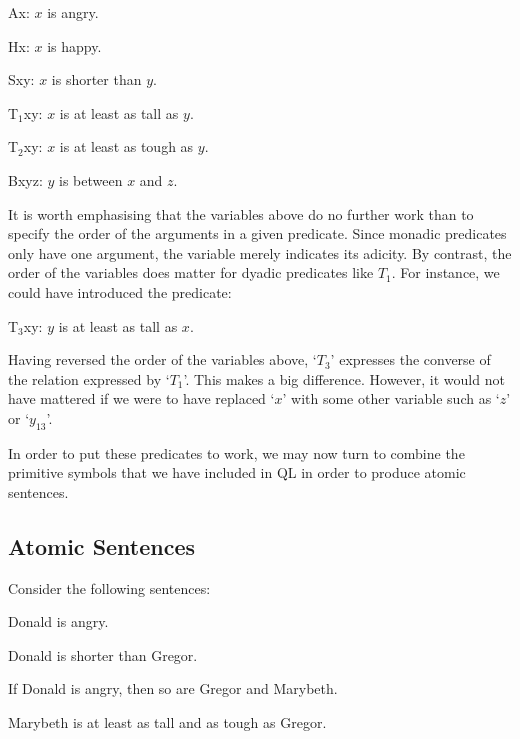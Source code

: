 \begin{ekey}
\item[Ax:] $x$ is angry.
\item[Hx:] $x$ is happy.
\item[Sxy:] $x$ is shorter than $y$.
\item[T$_1$xy:] $x$ is at least as tall as $y$.
\item[T$_2$xy:] $x$ is at least as tough as $y$.
\item[Bxyz:] $y$ is between $x$ and $z$.
\end{ekey}

It is worth emphasising that the variables above do no further work than to specify the order of the arguments in a given predicate. 
Since monadic predicates only have one argument, the variable merely indicates its adicity.
By contrast, the order of the variables does matter for dyadic predicates like $T_1$.
For instance, we could have introduced the predicate:

\begin{ekey}
\item[T$_3$xy:] $y$ is at least as tall as $x$.
\end{ekey}

Having reversed the order of the variables above, `$T_3$' expresses the converse of the relation expressed by `$T_1$'.
This makes a big difference.
However, it would not have mattered if we were to have replaced `$x$' with some other variable such as `$z$' or `$y_{13}$'.

In order to put these predicates to work, we may now turn to combine the primitive symbols that we have included in QL in order to produce atomic sentences.





\subsection{Atomic Sentences}

Consider the following sentences:

\begin{earg}
\item[\ex{terms1}] Donald is angry.
\item[\ex{terms2}] Donald is shorter than Gregor.
\item[\ex{terms3}] If Donald is angry, then so are Gregor and Marybeth.
\item[\ex{terms4}] Marybeth is at least as tall and as tough as Gregor.
\end{earg}

